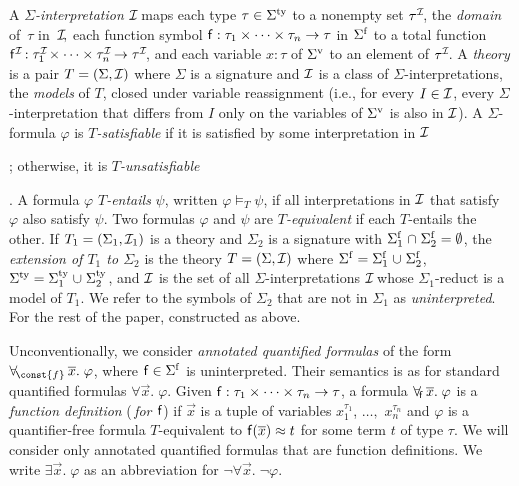 A \emph{$\Sigma$-interpretation $\mathcal{I\!}$} %
maps each type $\tau \in \stypes{\Sigma}$ to a nonempty set $\tau^{\mathcal{I\!}}$,
the \emph{domain} of~$\tau$ in~$\mathcal{I\!},$
each function symbol $\mathsf{f} : \tau_1 \times \cdots \times \tau_n \rightarrow \tau$ in $\sfuns{\Sigma}$
to a total function $\mathsf{f}^{\mathcal{I\!}} : \tau_{\smash{1}}^{\mathcal{I\!}} \times \cdots \times\allowbreak \tau_n^{\mathcal{I\!}} \rightarrow\allowbreak \tau^{\mathcal{I\!}}$,
and each variable $x:\tau$ of $\svars{\Sigma}$ to an element of $\tau^{\mathcal{I\!}}$.
A \emph{theory} is a pair $T = (\Sigma, \Mo)$ where
$\Sigma$ is a signature and ${\mathcal{I}}$ is a class of $\Sigma$-interpretations,
the \emph{models} of $T$, closed under variable reassignment
(i.e., for every $I \in {\mathcal{I}}$, every $\Sigma$-interpretation that differs
from $I$ only on the variables of $\svars \Sigma$ is also in ${\mathcal{I}}$).
A $\Sigma$-formula $\varphi$ is \emph{$T$-satisfiable}
if it is satisfied by some interpretation in ${\mathcal{I}}$\begin{rep};
otherwise, it is \emph{$T$-unsatisfiable}\end{rep}.
A formula $\varphi$ \emph{$T$-entails} $\psi$, written $\varphi \models_T \psi$,
if all interpretations in ${\mathcal{I}}$ that satisfy $\varphi$ also satisfy $\psi$.
Two formulas $\varphi$ and $\psi$ are \emph{$T$-equivalent}
if each $T$-entails the other.
If $T_1 = (\Sigma_1, \Mo_1)$ is a theory and $\Sigma_2$ is a signature
with $\sfuns{\Sigma_1} \cap \sfuns{\Sigma_2} = \emptyset$,
the \emph{extension of $T_1$ to $\Sigma_2$} is the theory $T = (\Sigma, \Mo)$ where
$\sfuns{\Sigma} = \sfuns{\Sigma_1} \cup \sfuns{\Sigma_2}$,
$\stypes{\Sigma} = \stypes{\Sigma_1} \cup \stypes{\Sigma_2}$,
and ${\mathcal{I}}$ is the set of all $\Sigma$-interpretations $\mathcal{I\!}$
whose $\Sigma_1$-reduct is a model of $T_1$.
We refer to the symbols of $\Sigma_2$ that are not in $\Sigma_1$ as \emph{uninterpreted}.
For the rest of the paper,  constructed as above.

Unconventionally,
we consider \emph{annotated quantified formulas} of the form
$\forallf{\const{f}} \vec x.\; \varphi$, where $\con{f} \in \sfuns{\Sigma}$ is
uninterpreted. Their
semantics is as for standard quantified formulas $\forall \vec x.\; \varphi$.
Given $\mathsf{f} : \tau_1 \times \cdots \times \tau_n \rightarrow \tau$,
a formula $\forall_{\!\mathsf{f}\:} \overline{x}.\; \varphi$ is a \emph{function definition}
(\,\emph{for $\mathsf{f}$}\vthinspace) if $\vec x$ is a tuple of variables
$x_1^{\tau_1}$, $\dotsc,$ $x_n^{\tau_n}$
and $\varphi$ is a quantifier-free formula
$T$-equivalent to $\mathsf{f}( \overline{x} ) \approx t$ for some term $t$ of type $\tau$.
We will consider only annotated quantified formulas that are function definitions.
We write $\exists
\vec x.\; \varphi$ as an abbreviation for $\neg \forall \vec x.\; \neg \varphi$.

